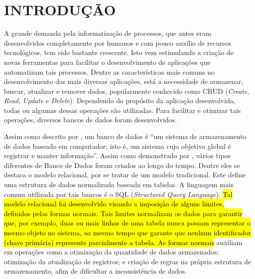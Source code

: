 \chapter{INTRODUÇÃO}
\label{Introducao}

A grande demanda pela informatização de processos, que antes eram desenvolvidos completamente por humanos e com pouco auxílio de recursos tecnológicos, tem sido bastante crescente. Isto vem estimulando a criação de novas ferramentas para facilitar o desenvolvimento de aplicações que automatizam tais processos. Dentre as características mais comuns no desenvolvimento das mais diversas aplicações, está a necessidade de armazenar, buscar, atualizar e remover dados, popularmente conhecido como CRUD (\textit{Create}, \textit{Read}, \textit{Update} e \textit{Delete}). Dependendo do propósito da aplicação desenvolvida, todas ou algumas dessas operações são utilizadas. Para facilitar e otimizar tais operações, diversos bancos de dados foram desenvolvidos.


Assim como descrito por , um banco de dados é ``um sistema de armazenamento de dados baseado em computador; isto é, um sistema cujo objetivo global é registrar e manter informação''. Assim como demonstrado por , vários tipos diferentes de Banco de Dados foram criados ao longo do tempo. Dentre eles se destaca o modelo relacional, por se tratar de um modelo tradicional. Este define uma estrutura de dados normalizada baseada em tabelas. A linguagem mais comum  utilizada por tais bancos é o SQL (\textit{Structured Query Language}). \hl{ } \hl{Tal modelo relacional foi desenvolvido visando a imposição de alguns limites, definidos pelas formas normais. Tais limites normalizam os dados para garantir que, por exemplo, duas ou mais linhas de uma tabela nunca possam representar o mesmo objeto no sistema, ao mesmo tempo que garante que nenhum identificador (chave primária) represente parcialmente a tabela. As formas normais} auxiliam em operações como a otimização da quantidade de dados armazenados; otimização da atualização de registros; e criação de regras na própria estrutura de armazenamento, afim de dificultar a inconsistência de dados.

